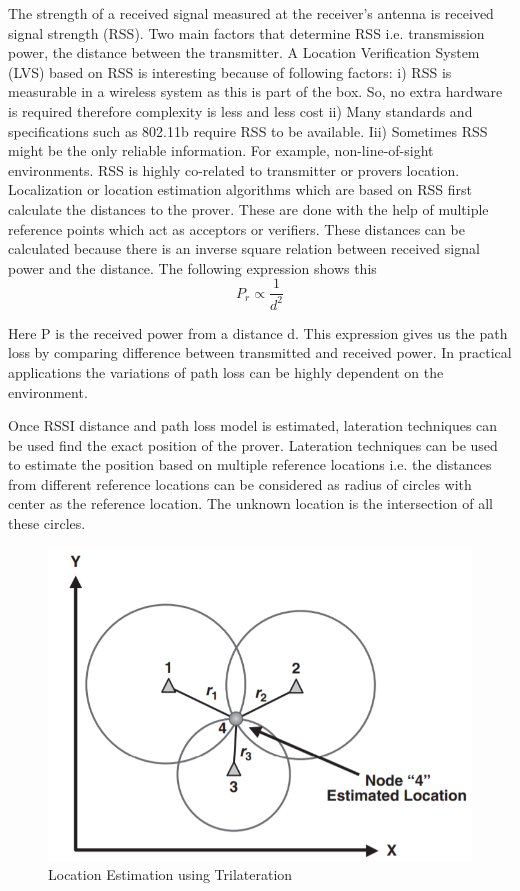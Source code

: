 The strength of a received signal measured at the receiver's antenna is received signal strength (RSS). Two main factors that determine RSS i.e. transmission power, the distance between the transmitter. 
A Location Verification System (LVS) based on RSS is interesting because of following factors: i) RSS is measurable in a wireless system as this is part of the box. So, no extra hardware is required therefore complexity is less and less cost ii) Many standards and specifications such as 802.11b require RSS to be available. Iii) Sometimes RSS might be the only reliable information. For example, non-line-of-sight environments. RSS is highly co-related to transmitter or provers location. Localization or location estimation algorithms which are based on RSS first calculate the distances to the prover. These are done with the help of multiple reference points which act as acceptors or verifiers. These distances can be calculated because there is an inverse square relation between received signal power and the distance. The following expression shows this
\begin{equation}
    P_r \propto \frac{1}{d^2}
    \label{gm_delay}
\end{equation}

Here P is the received power from a distance d. This expression gives us the path loss by comparing difference between transmitted and received power. In practical applications the variations of path loss can be highly dependent on the environment.

Once RSSI distance and path loss model is estimated, lateration techniques can be used find the exact position of the prover. Lateration techniques can be used to estimate the position based on multiple reference locations i.e. the distances from different reference locations can be considered as radius of circles with center as the reference location. The unknown location is the intersection of all these circles.

\begin{figure}
    \includegraphics[width=.47\textwidth]{strength_trilat_pic}
    \caption{Location Estimation using Trilateration \cite{}}
    \label{strength_trilat_pic}
\end{figure}


